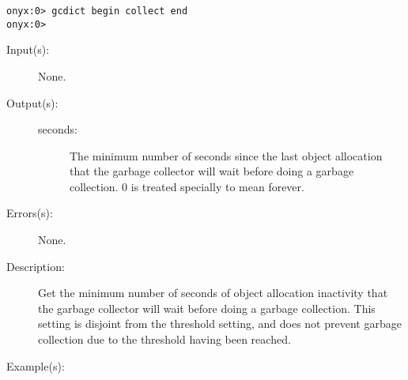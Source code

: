 \begin{description}
\begin{description}
\begin{verbatim}
onyx:0> gcdict begin collect end
onyx:0>
		\end{verbatim}
	\end{description}
\label{gcdict:period}
\item[{\onyxop{--}{period}{seconds}}: ]
	\begin{description}\item[]
	\item[Input(s): ] None.
	\item[Output(s): ]
		\begin{description}\item[]
		\item[seconds: ]
			The minimum number of seconds since the last object
			allocation that the garbage collector will wait before
			doing a garbage collection.  0 is treated specially to
			mean forever.
		\end{description}
	\item[Errors(s): ] None.
	\item[Description: ]
		Get the minimum number of seconds of object allocation
		inactivity that the garbage collector will wait before doing a
		garbage collection.  This setting is disjoint from the threshold
		setting, and does not prevent garbage collection due to the
		threshold having been reached.
	\item[Example(s): ]\begin{verbatim}


\end{verbatim}
\end{description}
\end{description}
